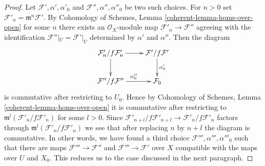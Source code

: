\documentclass{stacks-project}
\theoremstyle{plain}
\theoremstyle{definition}
\theoremstyle{remark}
\numberwithin{equation}{subsection}
\begin{document}
\begin{proof}
Let $\mathcal{F}', \alpha', \alpha'_0$ and
$\mathcal{F}'', \alpha'', \alpha''_0$ be two such choices.
For $n > 0$ set $\mathcal{F}'_n = \mathfrak m^n \mathcal{F}'$.
By Cohomology of Schemes, Lemma \ref{coherent-lemma-homs-over-open}
for some $n$
there exists an $\mathcal{O}_X$-module map $\mathcal{F}'_n \to \mathcal{F}''$
agreeing with the identification
$\mathcal{F}''|_U = \mathcal{F}'|_U$ determined by $\alpha'$ and $\alpha''$.
Then the diagram
$$
\xymatrix{
\mathcal{F}'_n/f\mathcal{F}'_n \ar[r] \ar[d] &
\mathcal{F}'/f\mathcal{F}' \ar[d]^{\alpha_0'} \\
\mathcal{F}''/f\mathcal{F}'' \ar[r]^{\alpha_0''} &
\mathcal{F}_0
}
$$
is commutative after restricting to $U_0$. Hence by
Cohomology of Schemes, Lemma \ref{coherent-lemma-homs-over-open}
it is commutative after restricting to
$\mathfrak m^l(\mathcal{F}'_n/f\mathcal{F}'_n)$ for some $l > 0$. Since
$\mathcal{F}'_{n + l}/f\mathcal{F}'_{n + l} \to \mathcal{F}'_n/f\mathcal{F}'_n$
factors through $\mathfrak m^l(\mathcal{F}'_n/f\mathcal{F}'_n)$
we see that after replacing $n$ by $n + l$ the diagram
is commutative. In other words, we have found a third choice
$\mathcal{F}''', \alpha''', \alpha'''_0$
such that there are maps $\mathcal{F}''' \to \mathcal{F}''$
and $\mathcal{F}''' \to \mathcal{F}'$ over $X$
compatible with the maps over $U$ and $X_0$. This reduces us to
the case discussed in the next paragraph.


\end{proof}
\end{document}
